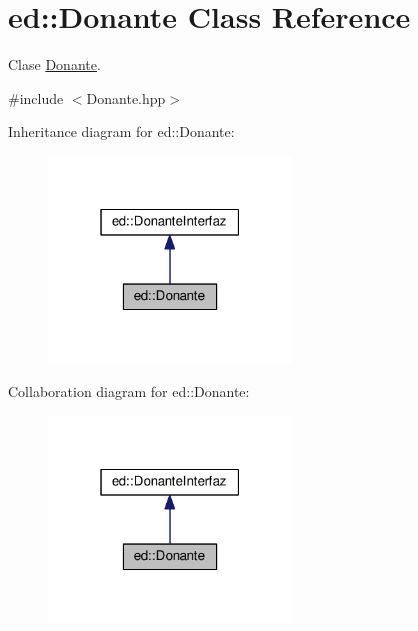 \hypertarget{classed_1_1Donante}{}\section{ed\+:\+:Donante Class Reference}
\label{classed_1_1Donante}


Clase \hyperlink{classed_1_1Donante}{Donante}.  




{\ttfamily \#include $<$Donante.\+hpp$>$}



Inheritance diagram for ed\+:\+:Donante\+:\nopagebreak
\begin{figure}[H]
\begin{center}
\leavevmode
\includegraphics[width=183pt]{classed_1_1Donante__inherit__graph}
\end{center}
\end{figure}


Collaboration diagram for ed\+:\+:Donante\+:\nopagebreak
\begin{figure}[H]
\begin{center}
\leavevmode
\includegraphics[width=183pt]{classed_1_1Donante__coll__graph}
\end{center}
\end{figure}
